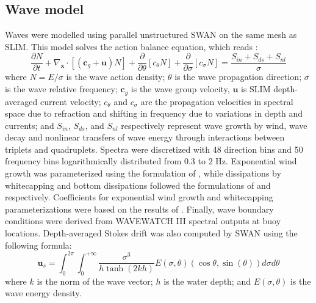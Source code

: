 \documentclass[11pt,a4paper]{article}
\begin{document}
\subsection{Wave model}
Waves were modelled using parallel unstructured SWAN \citep{booij1999third} on the same mesh as SLIM. This model solves the action balance equation, which reads \citep{mei1989applied}:
\begin{equation}
    \dfrac{\partial N}{\partial t} + \nabla_\mathbf{x}\cdot[(\mathbf{c}_g+\mathbf{u})N] + \dfrac{\partial }{\partial \theta}[c_\theta N] + \dfrac{\partial}{\partial \sigma}[c_\sigma N] = \dfrac{S_{in}+S_{ds}+S_{nl}}{\sigma} \label{eq:swan}
\end{equation}
where $N=E/\sigma$ is the wave action density; $\theta$ is the wave propagation direction; $\sigma$ is the wave relative frequency; $\mathbf{c}_g$ is the wave group velocity, $\mathbf{u}$ is SLIM depth-averaged current velocity; $c_\theta$ and $c_\sigma$ are the propagation velocities in spectral space due to refraction and shifting in frequency due to variations in depth and currents; and $S_{in}$, $S_{ds}$, and $S_{nl}$ respectively represent wave growth by wind, wave decay and nonlinear transfers of wave energy through interactions between triplets and quadruplets. Spectra were discretized with 48 direction bins and 50 frequency bins logarithmically distributed from 0.3 to 2 Hz. Exponential wind growth was parameterized using the formulation of \cite{janssen1991quasi}, while dissipations by whitecapping and bottom dissipations followed the formulations of \cite{komen1984existence} and \cite{madsen1989spectral} respectively. Coefficients for exponential wind growth and whitecapping parameterizations were based on the results of \cite{siadatmousavi2011evaluation}. Finally, wave boundary conditions were derived from WAVEWATCH III \citep{tolman2009user} spectral outputs at buoy locations. Depth-averaged Stokes drift was also computed by SWAN using the following formula:
\begin{equation}
    \mathbf{u}_{s} = \int_0^{2\pi}\int_0^{+\infty} \dfrac{\sigma^3}{h\tanh(2kh)}E(\sigma,\theta)(\cos\theta, \sin(\theta))d\sigma d\theta
\end{equation}
where $k$ is the norm of the wave vector; $h$ is the water depth; and $E(\sigma,\theta)$ is the wave energy density.
\end{document}
